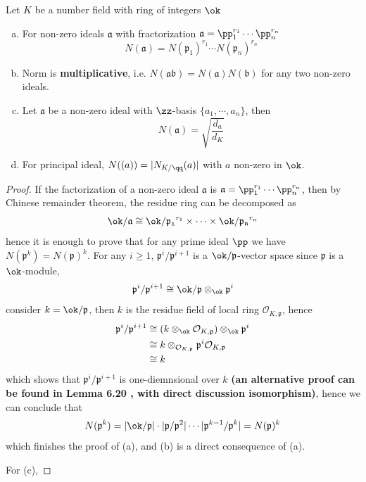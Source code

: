 \begin{colorproposition}
    Let \(K\) be a number field with ring of integers \(\ok\)
    \begin{enumerate} [(a)]
        \item For non-zero ideals \(\mathfrak{a}\) with fractorization \(\mathfrak{a} = \pp_1^{r_1} \cdots \pp_n^{r_n}\)
        \[N(\mathfrak{a}) = N(\mathfrak{p}_1)^{r_1} \cdots N(\mathfrak{p}_n)^{r_n}\]
        \item Norm is \textbf{multiplicative}, i.e. \(N(\mathfrak{ab}) = N(\mathfrak{a})N(\mathfrak{b})\) for any two non-zero ideals.
        \item Let \(\mathfrak{a}\) be a non-zero ideal with \(\zz\)-basis \(\{a_1,\cdots,a_n\}\), then
        \[N(\mathfrak{a})= \sqrt{\frac{d_{a}}{d_K}}\]
        \item For principal ideal, \(N((a)) = |N_{K/\qq}(a)|\) with \(a \) non-zero in \(\ok\).
    \end{enumerate}
\end{colorproposition}
\begin{proof}
    If the factorization of a non-zero ideal \(\mathfrak{a}\) is \(\mathfrak{a} = \pp_1^{r_1} \cdots \pp_n^{r_n}\), then by Chinese remainder theorem, the residue ring can be decomposed as
\[\ok/\mathfrak{a} \cong \ok/\mathfrak{p_1}^{r_1} \times \cdots \times \ok/\mathfrak{p_n}^{r_n}\]
hence it is enough to prove that for any prime ideal \(\pp\) we have \(N(\mathfrak{p}^k) = N(\mathfrak{p})^k\). For any \(i \geq 1\), \(\mathfrak{p}^i/\mathfrak{p}^{i+1}\) is a \(\ok/\mathfrak{p}\)-vector space since \(\mathfrak{p}\) is a \(\ok\)-module,
\[\mathfrak{p}^i/\mathfrak{p}^{i+1}\cong \ok/\mathfrak{p}\otimes_{\ok} \mathfrak{p}^i \]
consider \(k = \ok/\mathfrak{p}\), then \(k\) is the residue field of local ring \(\mathcal{O}_{K,\mathfrak{p}}\), hence 
\begin{align*}
    \mathfrak{p}^i/\mathfrak{p}^{i+1} &\cong (k \otimes_{\ok} \mathcal{O}_{K,\mathfrak{p}}) \otimes_{\ok} \mathfrak{p}^i \\
    &\cong k \otimes_{\mathcal{O}_{K,\mathfrak{p}}} \mathfrak{p}^i \mathcal{O}_{K,\mathfrak{p}} \\
    &\cong k
\end{align*}
which shows that \(\mathfrak{p}^i/\mathfrak{p}^{i+1}\) is one-diemnsional over \(k\) \textbf{(an alternative proof can be found in \cite{Tall} Lemma 6.20 , with direct discussion isomorphism)}, hence we can conclude that
\[N(\mathfrak{p}^k) = |\ok/\mathfrak{p}|\cdot|\mathfrak{p}/\mathfrak{p}^2|\cdots |\mathfrak{p}^{k-1}/\mathfrak{p}^k| = N(\mathfrak{p})^k\]
which finishes the proof of (a), and (b) is a direct consequence of (a).

For (c), 
\end{proof}


